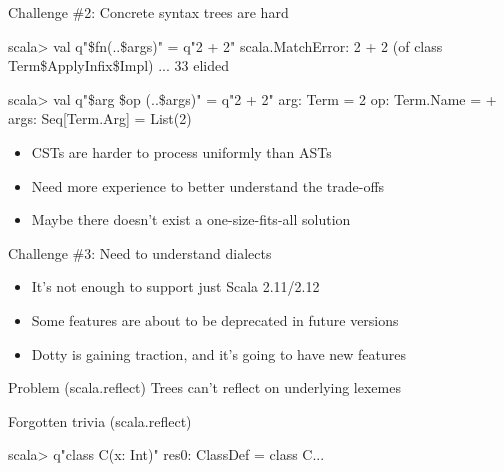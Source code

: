 \documentclass[svgnames,dvipsnames,hyperref={bookmarks=false},usepdftitle=false]{beamer}
\begin{document}
\begin{frame}[fragile]{Challenge \#2: Concrete syntax trees are hard}
\begin{semiverbatim}
scala> val q"\$fn(..\$args)" = q"2 + 2"
scala.MatchError: 2 + 2 (of class Term\$ApplyInfix\$Impl)
  ... 33 elided

scala> val q"\$arg \$op (..\$args)" = q"2 + 2"
arg: Term = 2
op: Term.Name = +
args: Seq[Term.Arg] = List(2)

\end{semiverbatim}

\begin{itemize}
\item CSTs are harder to process uniformly than ASTs
\item Need more experience to better understand the trade-offs
\item Maybe there doesn't exist a one-size-fits-all solution
\end{itemize}
\end{frame}

\begin{frame}{Challenge \#3: Need to understand dialects}
\begin{itemize}
\item It's not enough to support just Scala 2.11/2.12
\item Some features are about to be deprecated in future versions
\item Dotty is gaining traction, and it's going to have new features
\end{itemize}
\end{frame}


\begin{frame}{Problem (scala.reflect)}
Trees can't reflect on underlying lexemes
\end{frame}

\begin{frame}[fragile]{Forgotten trivia (scala.reflect)}
\begin{semiverbatim}
scala> q"class C(x: Int)"
res0: ClassDef = class C...
\end{semiverbatim}
\end{frame}
\end{document}
